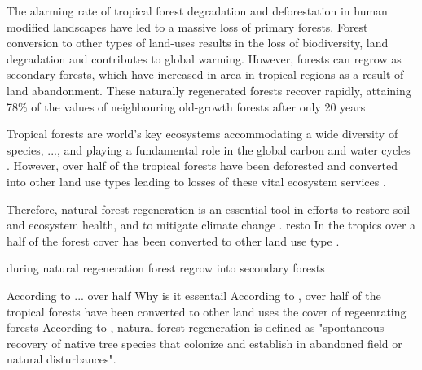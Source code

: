 


The alarming rate of tropical forest degradation and deforestation in human modified landscapes
have led to a massive loss of primary forests. Forest conversion to other types of land-uses results in
the loss of biodiversity, land degradation and contributes to global warming. However, forests can
regrow as secondary forests, which have increased in area in tropical regions as a result of land
abandonment. These naturally regenerated forests recover rapidly, attaining 78\% of the values of
neighbouring old-growth forests after only 20 years


Tropical forests are world's key ecosystems accommodating a wide diversity of species, ..., and playing a fundamental role in the global carbon and water cycles \citep{bormaCarbonContributionsSouth2022}. However, over half of the tropical forests have been deforested and converted into other land use types leading to losses of these vital ecosystem services \citep{chazdonNaturalRegenerationTool2016}. 

Therefore, natural forest regeneration is an essential tool in efforts to restore soil and ecosystem health, and to mitigate climate change \citep{hordijkLandUseHistory2024}.  resto In the tropics over a half of the forest cover has been converted to other land use type \citep{chazdonNaturalRegenerationTool2016}.

during natural regeneration forest regrow into secondary forests

According to ... over half Why is it essentail According to \citet{chazdonNaturalRegenerationTool2016}, over half of the tropical forests have been converted to other land uses the cover of regeenrating forests
According to \citet{crouzeillesEcologicalRestorationSuccess2017}, natural forest regeneration is defined as "spontaneous recovery of native tree species that colonize and establish in abandoned field or natural disturbances".


